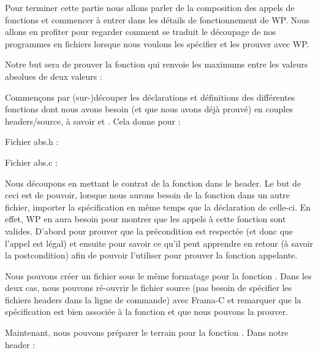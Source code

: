Pour terminer cette partie nous allons parler de la composition des appels de
fonctions et commencer à entrer dans les détails de fonctionnement de WP. Nous
allons en profiter pour regarder comment se traduit le découpage de nos
programmes en fichiers lorsque nous voulons les spécifier et les prouver avec WP.



Notre but sera de prouver la fonction  qui renvoie les maximums
entre les valeurs absolues de deux valeurs :






Commençons par (sur-)découper les déclarations et définitions des différentes
fonctions dont nous avons besoin (et que nous avons déjà prouvé) en couples
headers/source, à savoir  et . Cela donne pour
 :



Fichier abs.h :



Fichier abs.c :




Nous découpons en mettant le contrat de la fonction dans le header. Le but de
ceci est de pouvoir, lorsque nous aurons besoin de la fonction dans un autre
fichier, importer la spécification en même temps que la déclaration de
celle-ci. En effet, WP en aura besoin pour montrer que les appels à cette
fonction sont valides. D'abord pour prouver que la précondition est respectée
(et donc que l'appel est légal) et ensuite pour savoir ce qu'il peut apprendre
en retour (à savoir la postcondition) afin de pouvoir l'utiliser pour prouver
la fonction appelante.



Nous pouvons créer un fichier sous le même formatage pour la fonction .
Dans les deux cas, nous pouvons ré-ouvrir le fichier source (pas besoin de
spécifier les fichiers headers dans la ligne de commande) avec Frama-C et
remarquer que la spécification est bien associée à la fonction et que nous
pouvons la prouver.



Maintenant, nous pouvons préparer le terrain pour la fonction .
Dans notre header :






